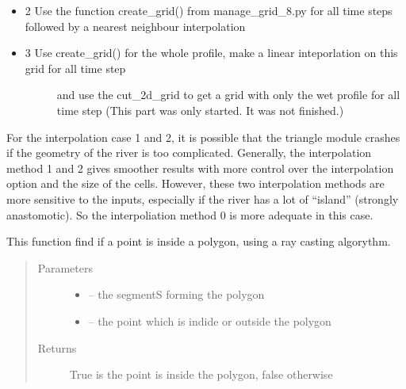 \documentclass[letterpaper,10pt,english]{sphinxmanual}
\begin{document}
\begin{fulllineitems}
\begin{itemize}
\item {} 
2 Use the function create\_grid() from manage\_grid\_8.py for all time steps followed by a nearest neighbour interpolation

\item {} \begin{description}
\item[{3 Use create\_grid() for the whole profile, make a linear inteporlation on this grid for all time step}] \leavevmode
and use the cut\_2d\_grid to get a grid with only the wet profile for all time step (This part was only started.
It was not finished.)

\end{description}

\end{itemize}

For the interpolation case 1 and 2, it is possible that the triangle module crashes if the geometry of the
river is too complicated. Generally, the interpolation method 1 and 2 gives smoother results with more control
over the interpolation option and the size of the cells. However, these two interpolation methods are more sensitive
to the inputs, especially if the river has a lot of ``island'' (strongly anastomotic). So the interpoliation method 0
is more adequate in this case.

\end{fulllineitems}


\begin{fulllineitems}
\label{\detokenize{index:src.manage_grid_8.inside_polygon}}
This function find if a point is inside a polygon, using a ray casting algorythm.
\begin{quote}\begin{description}
\item[{Parameters}] \leavevmode\begin{itemize}
\item {} 
 -- the segmentS forming the polygon

\item {} 
 -- the point which is indide or outside the polygon

\end{itemize}

\item[{Returns}] \leavevmode
True is the point is inside the polygon, false otherwise

\end{description}\end{quote}

\end{fulllineitems}
\end{document}
